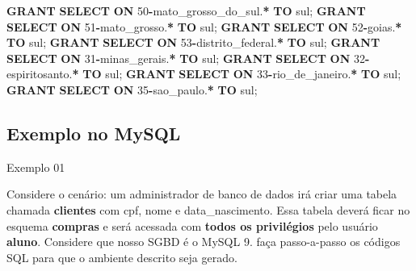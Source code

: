 \documentclass[
]{book}
\newenvironment{Shaded}{\begin{snugshade}}{\end{snugshade}}
\newcommand{\DecValTok}[1]{\textcolor[rgb]{0.00,0.00,0.81}{#1}}
\newcommand{\KeywordTok}[1]{\textcolor[rgb]{0.13,0.29,0.53}{\textbf{#1}}}
\newcommand{\NormalTok}[1]{#1}
\newcommand{\OperatorTok}[1]{\textcolor[rgb]{0.81,0.36,0.00}{\textbf{#1}}}
\newcommand{\StringTok}[1]{\textcolor[rgb]{0.31,0.60,0.02}{#1}}
\begin{document}
\begin{Shaded}
\begin{Highlighting}[]
\KeywordTok{GRANT} \KeywordTok{SELECT} \KeywordTok{ON}\NormalTok{ \textasciigrave{}}\DecValTok{50}\OperatorTok{{-}}\NormalTok{mato\_grosso\_do\_sul\textasciigrave{}.}\OperatorTok{*} \KeywordTok{TO} \StringTok{\textquotesingle{}sul\textquotesingle{}}\NormalTok{;}
\KeywordTok{GRANT} \KeywordTok{SELECT} \KeywordTok{ON}\NormalTok{ \textasciigrave{}}\DecValTok{51}\OperatorTok{{-}}\NormalTok{mato\_grosso\textasciigrave{}.}\OperatorTok{*}       \KeywordTok{TO} \StringTok{\textquotesingle{}sul\textquotesingle{}}\NormalTok{;}
\KeywordTok{GRANT} \KeywordTok{SELECT} \KeywordTok{ON}\NormalTok{ \textasciigrave{}}\DecValTok{52}\OperatorTok{{-}}\NormalTok{goias\textasciigrave{}.}\OperatorTok{*}             \KeywordTok{TO} \StringTok{\textquotesingle{}sul\textquotesingle{}}\NormalTok{;}
\KeywordTok{GRANT} \KeywordTok{SELECT} \KeywordTok{ON}\NormalTok{ \textasciigrave{}}\DecValTok{53}\OperatorTok{{-}}\NormalTok{distrito\_federal\textasciigrave{}.}\OperatorTok{*}  \KeywordTok{TO} \StringTok{\textquotesingle{}sul\textquotesingle{}}\NormalTok{;}
\KeywordTok{GRANT} \KeywordTok{SELECT} \KeywordTok{ON}\NormalTok{ \textasciigrave{}}\DecValTok{31}\OperatorTok{{-}}\NormalTok{minas\_gerais\textasciigrave{}.}\OperatorTok{*}      \KeywordTok{TO} \StringTok{\textquotesingle{}sul\textquotesingle{}}\NormalTok{;}
\KeywordTok{GRANT} \KeywordTok{SELECT} \KeywordTok{ON}\NormalTok{ \textasciigrave{}}\DecValTok{32}\OperatorTok{{-}}\NormalTok{espiritosanto\textasciigrave{}.}\OperatorTok{*}     \KeywordTok{TO} \StringTok{\textquotesingle{}sul\textquotesingle{}}\NormalTok{;}
\KeywordTok{GRANT} \KeywordTok{SELECT} \KeywordTok{ON}\NormalTok{ \textasciigrave{}}\DecValTok{33}\OperatorTok{{-}}\NormalTok{rio\_de\_janeiro\textasciigrave{}.}\OperatorTok{*}    \KeywordTok{TO} \StringTok{\textquotesingle{}sul\textquotesingle{}}\NormalTok{;}
\KeywordTok{GRANT} \KeywordTok{SELECT} \KeywordTok{ON}\NormalTok{ \textasciigrave{}}\DecValTok{35}\OperatorTok{{-}}\NormalTok{sao\_paulo\textasciigrave{}.}\OperatorTok{*}         \KeywordTok{TO} \StringTok{\textquotesingle{}sul\textquotesingle{}}\NormalTok{;}
\end{Highlighting}
\end{Shaded}

\subsection{Exemplo no MySQL}\label{exemplo-no-mysql}

Exemplo 01

Considere o cenário: um administrador de banco de dados irá criar uma tabela chamada \textbf{clientes} com cpf, nome e data\_nascimento. Essa tabela deverá ficar no esquema \textbf{compras} e será acessada com \textbf{todos os privilégios} pelo usuário \textbf{aluno}. Considere que nosso SGBD é o MySQL 9. faça passo-a-passo os códigos SQL para que o ambiente descrito seja gerado.
\end{document}
